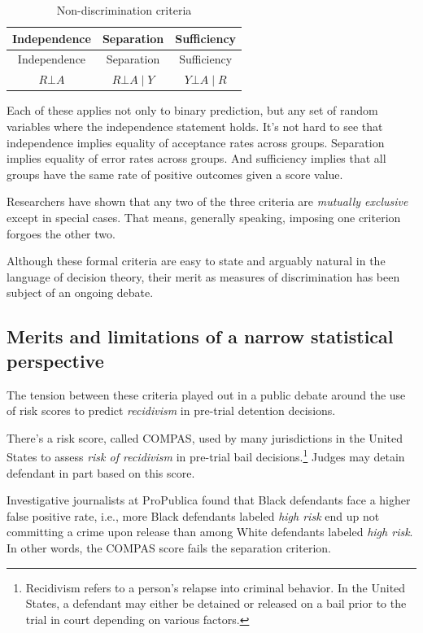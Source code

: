 \documentclass{tufte-book}
\begin{document}
\begin{longtable}[]{@{}ccc@{}}
\caption{Non-discrimination criteria}\tabularnewline
\toprule
Independence & Separation & Sufficiency \\
\midrule
\endfirsthead
\toprule
Independence & Separation & Sufficiency \\
\midrule
\endhead
\(R\bot A\) & \(R\bot A \mid Y\) & \(Y\bot A\mid R\) \\
\bottomrule
\end{longtable}

Each of these applies not only to binary prediction, but any set of
random variables where the independence statement holds. It's not hard
to see that independence implies equality of acceptance rates across
groups. Separation implies equality of error rates across groups. And
sufficiency implies that all groups have the same rate of positive
outcomes given a score value.

Researchers have shown that any two of the three criteria are
\emph{mutually exclusive} except in special cases. That means, generally
speaking, imposing one criterion forgoes the other two.

Although these formal criteria are easy to state and arguably natural in
the language of decision theory, their merit as measures of
discrimination has been subject of an ongoing debate.

\hypertarget{merits-and-limitations-of-a-narrow-statistical-perspective}{%
\subsection{Merits and limitations of a narrow statistical
perspective}\label{merits-and-limitations-of-a-narrow-statistical-perspective}}

The tension between these criteria played out in a public debate around
the use of risk scores to predict \emph{recidivism} in pre-trial
detention decisions.

There's a risk score, called COMPAS, used by many jurisdictions in the
United States to assess \emph{risk of recidivism} in pre-trial bail
decisions.\footnote{Recidivism refers to a person's relapse into
  criminal behavior. In the United States, a defendant may either be
  detained or released on a bail prior to the trial in court depending
  on various factors.} Judges may detain defendant in part based on this
score.

Investigative journalists at ProPublica found that Black defendants face
a higher false positive rate, i.e., more Black defendants labeled
\emph{high risk} end up not committing a crime upon release than among
White defendants labeled \emph{high risk}. In other words, the COMPAS
score fails the separation criterion.
\end{document}
